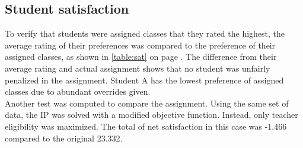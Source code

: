 \documentclass[11pt]{article}
\begin{document}
\subsection{Student satisfaction}
To verify that students were assigned classes that they rated the highest, the average rating of their preferences was compared to the preference of their assigned classes, as shown in \ref{table:sat} on page \pageref{table:sat}. The difference from their average rating and actual assignment shows that no student was unfairly penalized in the assignment. Student A has the lowest preference of assigned classes due to abundant overrides given.\\
\indent Another test was computed to compare the assignment. Using the same set of data, the IP was solved with a modified objective function. Instead, only teacher eligibility was maximized. The total of net satisfaction in this case was -1.466 compared to the original 23.332.\\
\end{document}
